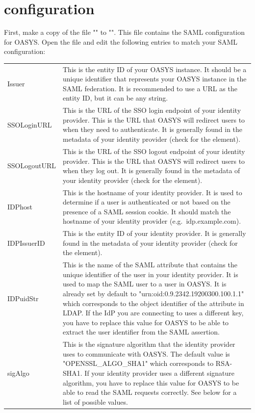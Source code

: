 \documentclass[12pt]{article} %
\newenvironment{keyword}{\leavevmode\color{magenta}\ttfamily}{}
\newenvironment{properties}
{
    \footnotesize\renewcommand{\arraystretch}{1.30}
    \renewcommand{\tabcolsep}{0pt}
    \begin{longtable}{>{\begin{keyword}}p{3.1cm}<{\end{keyword}}p{13.9cm}}
        \hline
        }
        {
        \hline
    \end{longtable}\vspace{5mm}
}
\renewcommand{\tabcolsep}{0pt}
\begin{document}
    \section{configuration}\label{sec:configuration}
    First, make a copy of the file "" to "". This file contains the SAML configuration for OASYS. Open the file and edit the following entries to match your SAML configuration:
    \begin{properties}
    \hline
        Issuer & This is the entity ID of your OASYS instance. It should be a unique identifier that represents your OASYS instance in the SAML federation. It is recommended to use a URL as the entity ID, but it can be any string.\\
        SSOLoginURL & This is the URL of the SSO login endpoint of your identity provider. This is the URL that OASYS will redirect users to when they need to authenticate. It is generally found in the metadata of your identity provider (check for the \kw{SingleSignOnService} element).\\
        SSOLogoutURL & This is the URL of the SSO logout endpoint of your identity provider. This is the URL that OASYS will redirect users to when they log out. It is generally found in the metadata of your identity provider (check for the \kw{SingleLogoutService} element).\\
        IDPhost & This is the hostname of your identity provider. It is used to determine if a user is authenticated or not based on the presence of a SAML session cookie. It should match the hostname of your identity provider (e.g.\ idp.example.com).\\
        IDPIssuerID & This is the entity ID of your identity provider. It is generally found in the metadata of your identity provider (check for the \kw{entityid} element).\\
        IDPuidStr & This is the name of the SAML attribute that contains the unique identifier of the user in your identity provider. It is used to map the SAML user to a user in OASYS. It is already set by default to "urn:oid:0.9.2342.19200300.100.1.1" which corresponds to the object identifier of the \kw{uid} attribute in LDAP. If the IdP you are connecting to uses a different key, you have to replace this value for OASYS to be able to extract the user identifier from the SAML assertion.\\
        sigAlgo & This is the signature algorithm that the identity provider uses to communicate with OASYS. The default value is "OPENSSL\_ALGO\_SHA1" which corresponds to RSA-SHA1. If your identity provider uses a different signature algorithm, you have to replace this value for OASYS to be able to read the SAML requests correctly. See below for a list of possible values.\\

\end{properties}
\end{document}
